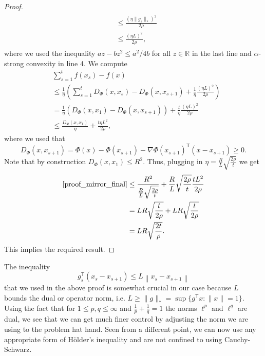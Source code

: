 \begin{proof}
\begin{align}
\begin{aligned}
	& \leq \frac{\left(\eta \|g_s\|_\ast\right)^2}{2\rho} \\
    & \leq \frac{\left(\eta L\right)^2}{2\rho},
    \end{aligned}
\end{align}
where we used the inequality $az - bz^2 \leq a^2/4b$ for all $z\in \mathbb{R}$ in the last line and $\alpha$-strong convexity in line 4. We compute
\begin{align}
	& \sum_{s=1}^t f(x_s) - f(x) \nonumber \\
	& \leq  \frac{1}{\eta} \left(\sum_{s=1}^t D_\Phi(x, x_s) - D_\Phi(x, x_{s+1}) +  \frac{1}{\eta}\frac{\left(\eta L\right)^2}{2\rho}\right) \nonumber \\
	& =  \frac{1}{\eta} \left(D_\Phi(x, x_1) - D_\Phi(x, x_{s+1})\right) +  \frac{t}{\eta}\frac{\left(\eta L\right)^2}{2\rho} \nonumber \\ \label{proof_mirror_final}
	& \leq \frac{D_\Phi(x, x_1)}{\eta} + \frac{t\eta L^2}{2\rho},
\end{align}
where we used that
\begin{equation*}
	D_\Phi(x, x_{s+1}) = \Phi(x) - \Phi(x_{s+1}) - \nabla \Phi(x_{s+1})^\mathsf{T}(x - x_{s+1}) \geq 0.
\end{equation*}
Note that by construction $D_\Phi(x,x_1) \leq R^2$. Thus, plugging in $\eta =\frac{R}{L}\sqrt{\frac{2\rho}{t}}$ we get
\begin{align*}
	\eqref{proof_mirror_final} &\leq \frac{R^2}{\frac{R}{L}\sqrt{\frac{2\rho}{t}}} + \frac{R}{L}\sqrt{\frac{2\rho}{t}}\frac{t L^2}{2\rho} \\
	& = LR \sqrt{\frac{t}{2 \rho}} + LR\sqrt{\frac{t}{2 \rho}} \\
	& = LR \sqrt{\frac{2t}{\rho}}.
\end{align*}
This implies the required result.
\end{proof}
\begin{remark}
The inequality
\begin{equation*}
g_s^\mathsf{T}\left(x_s - x_{s+1}\right) \leq L\left\|x_s - x_{s+1}\right\|
\end{equation*}
that we used in the above proof is somewhat crucial in our case because $L$ bounds the dual or operator norm, i.e. $L \geq \|g\|_* = \sup\{g^\mathsf{T}x : \|x\|=1\}$. Using the fact that for $1 \leq p, q \leq \infty$ and $\frac{1}{p} + \frac{1}{q} = 1$ the norms $\ell^p$ and $\ell^q$ are dual, we see that we can get much finer control by adjusting the norm we are using to the problem hat hand. Seen from a different point, we can now use any appropriate form of Hölder's inequality and are not confined to using Cauchy-Schwarz.
\end{remark}

